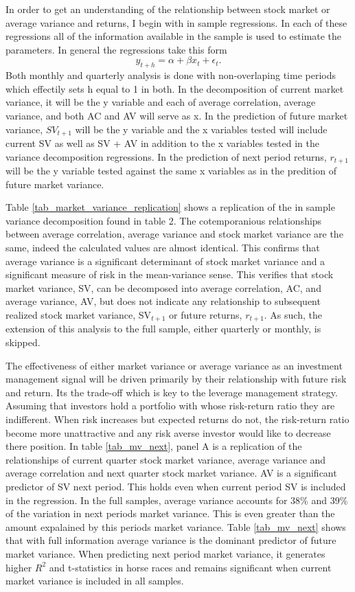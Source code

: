 In order to get an understanding of the relationship between stock market or average variance and returns, I begin with in sample regressions. In each of these regressions all of the information available in the sample is used to estimate the parameters. In general the regressions take this form
\begin{equation}
	y_{t+h} = \alpha + \beta x_{t} + \epsilon_{t}.
\end{equation}
Both monthly and quarterly analysis is done with non-overlaping time periods which effectily sets h equal to 1 in both. In the decomposition of current market variance, it will be the y variable and each of average correlation, average variance, and both AC and AV will serve as x. In the prediction of future market variance, $SV_{t+1}$ will be the y variable and the x variables tested will include current SV as well as SV + AV in addition to the x variables tested in the variance decomposition regressions. In the prediction of next period returns, $r_{t+1}$ will be the y variable tested against the same x variables as in the predition of future market variance.

Table \ref{tab_market_variance_replication} shows a replication of the in sample variance decomposition found in \citet{pollet_average_2010} table 2. The cotemporanious relationships between average correlation, average variance and stock market variance are the same, indeed the calculated values are almost identical. This confirms that average variance is a significant determinant of stock market variance and a significant measure of risk in the mean-variance sense. This verifies that stock market variance, SV, can be decomposed into average correlation, AC, and average variance, AV, but does not indicate any relationship to subsequent realized stock market variance, SV$_{t+1}$ or future returns, $r_{t+1}$. As such, the extension of this analysis to the full sample, either quarterly or monthly, is skipped.

The effectiveness of either market variance or average variance as an investment management signal will be driven primarily by their relationship with future risk and return. Its the trade-off which is key to the leverage management strategy. Assuming that investors hold a portfolio with whose risk-return ratio they are indifferent. When risk increases but expected returns do not, the risk-return ratio become more unattractive and any risk averse investor would like to decrease there position. In table \ref{tab_mv_next}, panel A is a replication of the relationships of current quarter stock market variance, average variance and average correlation and next quarter stock market variance. AV is a significant predictor of SV next period. This holds even when current period SV is included in the regression. In the full samples, average variance accounts for 38\% and 39\% of the variation in next periods market variance. This is even greater than the amount expalained by this periods market variance. Table \ref{tab_mv_next} shows that with full information average variance is the dominant predictor of future market variance. When predicting next period market variance, it generates higher $R^{2}$ and t-statistics in horse races and remains significant when current market variance is included in all samples.

